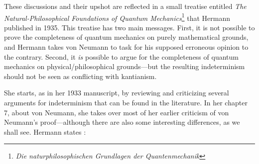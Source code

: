 \documentclass[12pt]{article}
\begin{document}
These discussions and their upshot are reflected in a small treatise entitled \emph{The Natural-Philosophical Foundations of Quantum Mechanics}\footnote{\emph{Die naturphilosophischen Grundlagen der Quantenmechanik}} \cite{hermann1} that Hermann published in 1935. This treatise has two main messages. First, it is not possible to prove the completeness of quantum mechanics on purely mathematical grounds, and Hermann takes von Neumann to task for his supposed erroneous opinion to the contrary. Second, it \emph{is} possible to argue for the completeness of quantum mechanics on physical/philosophical grounds---but the resulting indeterminism should not be seen as conflicting with kantianism.

She starts, as in her 1933 manuscript, by reviewing and criticizing several arguments for indeterminism that can be found in the literature. In her chapter 7, about von Neumann, she takes over most of her earlier criticism of von Neumann's proof---although there are also some interesting differences, as we shall see. Hermann states \cite[pp.\@ 208--209]{crull}:
\end{document}
